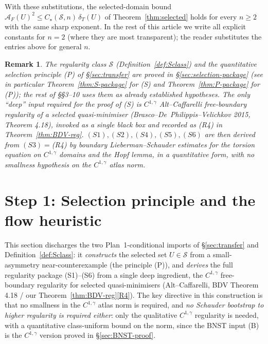 \documentclass[11pt]{amsart}
\newtheorem{remark}[theorem]{Remark}
\newcommand{\dT}{\delta_T}
\newcommand{\AF}{\mathcal A_F}
\newcommand{\Sclass}{\mathcal S}
\begin{document}
With these substitutions, the selected-domain bound
$\AF(U)^{2}\le C_\star(\Sclass,n)\,\dT(U)$ of
Theorem~\ref{thm:selected} holds for every $n\ge 2$ with the same
sharp exponent.  In the rest of this article we write all explicit
constants for $n=2$ (where they are most transparent); the reader
substitutes the entries above for general $n$.

\begin{remark}\label{rem:Plan1}
The regularity class $\Sclass$ (Definition~\ref{def:Sclass}) and the
quantitative selection principle (P) of \S\ref{sec:transfer} are
\emph{proved in \S\ref{sec:selection-package}} (see in particular
Theorem~\ref{thm:S-package} for (S) and Theorem~\ref{thm:P-package}
for (P)); the rest of \S\S3--10 uses them as already established
hypotheses.  The only ``deep'' input required for the proof of (S)
is $C^{1,\gamma}$ Alt--Caffarelli free-boundary regularity of a
selected quasi-minimiser (Brasco--De~Philippis--Velichkov 2015,
Theorem 4.18), invoked as a single black box and recorded as (R4) in
Theorem~\ref{thm:BDV-reg}.  $(S1),(S2),(S4),(S5),(S6)$ are then
derived from $(S3)=$(R4) by boundary Lieberman--Schauder estimates
for the torsion equation on $C^{1,\gamma}$ domains and the Hopf
lemma, in a quantitative form, with no smallness hypothesis on the
$C^{1,\gamma}$ atlas norm.
\end{remark}

\section{Step 1: Selection principle and the flow heuristic}\label{sec:step1-selection}
\label{sec:selection-package}

This section discharges the two Plan~1-conditional imports of
\S\ref{sec:transfer} and Definition~\ref{def:Sclass}: it
\emph{constructs} the selected set $U\in\Sclass$ from a
small-asymmetry near-counterexample (the principle (P)), and
\emph{derives} the full regularity package (S1)--(S6) from a single
deep ingredient, the $C^{1,\gamma}$ free-boundary regularity for
selected quasi-minimisers (Alt--Caffarelli, BDV Theorem 4.18 / our
Theorem~\ref{thm:BDV-reg}\ref{R4}).  The key directive in this
construction is that no smallness in the $C^{1,\gamma}$ atlas norm
is required, and \emph{no Schauder bootstrap to higher regularity is
required either}: only the qualitative $C^{1,\gamma}$ regularity is
needed, with a quantitative class-uniform bound on the norm, since
the BNST input (B) is the $C^{1,\gamma}$ version proved in
\S\ref{sec:BNST-proof}.
\end{document}
